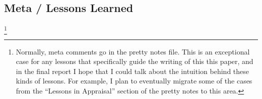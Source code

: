 \documentclass[11pt]{article}
\begin{document}
\begin{centering}
\section{Meta / Lessons Learned}
\end{centering}

\footnote{Normally, meta comments go in the pretty notes file. This is an
exceptional case for any lessons that specifically guide the writing of this
this paper, and in the final report I hope that I could talk about the
intuition behind these kinds of lessons. For example, I plan to eventually
migrate some of the cases from the ``Lessons in Appraisal'' section of the
pretty notes to this area.
}

 {
    \printbibliography
}
\end{document}
